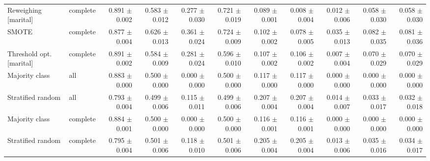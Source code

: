 \begin{table}[t]
{\begin{tabular}{llrrrrrrrrr}
Reweighing {[}marital{]} & complete & 0.891 $\pm$ 0.002 & 0.583 $\pm$ 0.012 & 0.277 $\pm$ 0.030 & 0.721 $\pm$ 0.019 & 0.089 $\pm$ 0.001 & 0.008 $\pm$ 0.004 & 0.012 $\pm$ 0.006 & 0.058 $\pm$ 0.030 & 0.058 $\pm$ 0.030 \\
SMOTE & complete & 0.877 $\pm$ 0.004 & 0.626 $\pm$ 0.013 & 0.361 $\pm$ 0.024 & 0.724 $\pm$ 0.009 & 0.102 $\pm$ 0.002 & 0.078 $\pm$ 0.005 & 0.035 $\pm$ 0.013 & 0.082 $\pm$ 0.035 & 0.081 $\pm$ 0.036 \\
Threshold opt. {[}marital{]} & complete & 0.891 $\pm$ 0.002 & 0.584 $\pm$ 0.009 & 0.281 $\pm$ 0.024 & 0.596 $\pm$ 0.010 & 0.107 $\pm$ 0.002 & 0.106 $\pm$ 0.002 & 0.007 $\pm$ 0.004 & 0.070 $\pm$ 0.029 & 0.070 $\pm$ 0.029 \\
Majority class & all & 0.883 $\pm$ 0.000 & 0.500 $\pm$ 0.000 & 0.000 $\pm$ 0.000 & 0.500 $\pm$ 0.000 & 0.117 $\pm$ 0.000 & 0.117 $\pm$ 0.000 & 0.000 $\pm$ 0.000 & 0.000 $\pm$ 0.000 & 0.000 $\pm$ 0.000 \\
Stratified random & all & 0.793 $\pm$ 0.004 & 0.499 $\pm$ 0.006 & 0.115 $\pm$ 0.011 & 0.499 $\pm$ 0.006 & 0.207 $\pm$ 0.004 & 0.207 $\pm$ 0.004 & 0.014 $\pm$ 0.007 & 0.033 $\pm$ 0.017 & 0.032 $\pm$ 0.018 \\
Majority class & complete & 0.884 $\pm$ 0.001 & 0.500 $\pm$ 0.000 & 0.000 $\pm$ 0.000 & 0.500 $\pm$ 0.000 & 0.116 $\pm$ 0.001 & 0.116 $\pm$ 0.001 & 0.000 $\pm$ 0.000 & 0.000 $\pm$ 0.000 & 0.000 $\pm$ 0.000 \\
Stratified random & complete & 0.795 $\pm$ 0.004 & 0.501 $\pm$ 0.006 & 0.118 $\pm$ 0.010 & 0.501 $\pm$ 0.006 & 0.205 $\pm$ 0.004 & 0.205 $\pm$ 0.004 & 0.013 $\pm$ 0.006 & 0.035 $\pm$ 0.016 & 0.034 $\pm$ 0.017 \\
\bottomrule
\end{tabular}}
\end{table}
